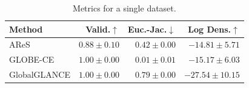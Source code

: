 \begin{table}[h]
\centering
\caption{Metrics for a single dataset.}
\label{tab:single_dataset_metrics}
\begin{center}
\begin{sc}
\begin{scriptsize}
\begin{tabular}{l|rrr}
\toprule
Method & Valid.$\uparrow$ & Euc.-Jac.$\downarrow$ & Log Dens.$\uparrow$ \\
\midrule
AReS & $0.88\pm{0.10}$ & $0.42\pm{0.00}$ & $\boldsymbol{-14.81\pm{5.71}}$ \\
GLOBE-CE & $\boldsymbol{1.00\pm{0.00}}$ & $\boldsymbol{0.01\pm{0.01}}$ & $-15.17\pm{6.03}$ \\
GlobalGLANCE & $\boldsymbol{1.00\pm{0.00}}$ & $0.79\pm{0.00}$ & $-27.54\pm{10.15}$ \\
\bottomrule
\end{tabular}
\end{scriptsize}
\end{sc}
\end{center}
\end{table}
